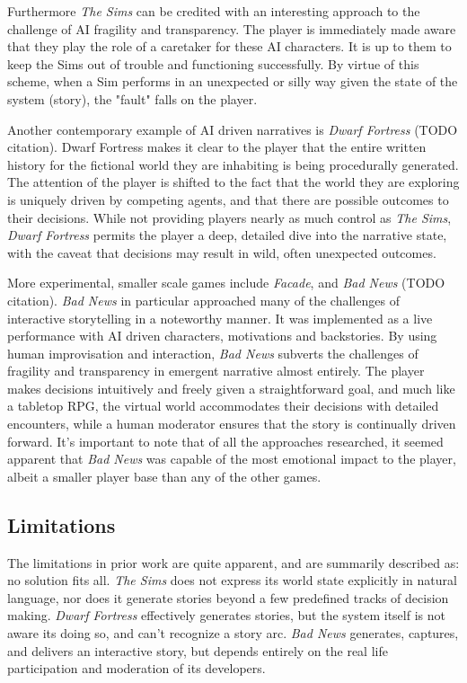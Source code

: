 \documentclass[letterpaper, 10 pt, conference]{ieeeconf}  %
\begin{document}
	Furthermore \emph{The Sims} can be credited with an interesting approach to the challenge of AI fragility and transparency. The player is immediately made aware that they play the role of a caretaker for these AI characters. It is up to them to keep the Sims out of trouble and functioning successfully. By virtue of this scheme, when a Sim performs in an unexpected or silly way given the state of the system (story), the "fault" falls on the player.
	
	Another contemporary example of AI driven narratives is \emph{Dwarf Fortress} (TODO citation). Dwarf Fortress makes it clear to the player that the entire written history for the fictional world they are inhabiting is being procedurally generated. The attention of the player is shifted to the fact that the world they are exploring is uniquely driven by competing agents, and that there are possible outcomes to their decisions. While not providing players nearly as much control as \emph{The Sims}, \emph{Dwarf Fortress} permits the player a deep, detailed dive into the narrative state, with the caveat that decisions may result in wild, often unexpected outcomes.
	
	More experimental, smaller scale games include \emph{Facade}, and \emph{Bad News} (TODO citation). \emph{Bad News} in particular approached many of the challenges of interactive storytelling in a noteworthy manner. It was implemented as a live performance with AI driven characters, motivations and backstories. By using human improvisation and interaction, \emph{Bad News} subverts the challenges of fragility and transparency in emergent narrative almost entirely. The player makes decisions intuitively and freely given a straightforward goal, and much like a tabletop RPG, the virtual world accommodates their decisions with detailed encounters, while a human moderator ensures that the story is continually driven forward. It's important to note that of all the approaches researched, it seemed apparent that \emph{Bad News} was capable of the most emotional impact to the player, albeit a smaller player base than any of the other games.
\subsection{Limitations}
	The limitations in prior work are quite apparent, and are summarily described as: no solution fits all. \emph{The Sims} does not express its world state explicitly in natural language, nor does it generate stories beyond a few predefined tracks of decision making. \emph{Dwarf Fortress} effectively generates stories, but the system itself is not aware its doing so, and can't recognize a story arc. \emph{Bad News} generates, captures, and delivers an interactive story, but depends entirely on the real life participation and moderation of its developers.
	
\end{document}

